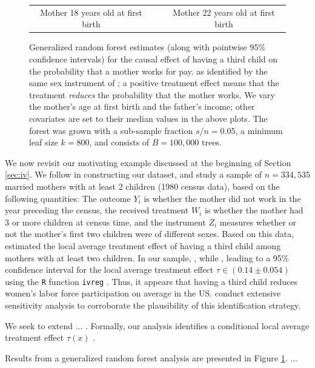 \documentclass[aos]{imsart}
\theoremstyle{plain}
\theoremstyle{definition}
\theoremstyle{remark}
\begin{document}
\begin{CJK}{UTF8}{gbsn}
\begin{figure}
\begin{tabular}{ccc}
Mother 18 years old at first birth & & Mother 22 years old at first birth
\end{tabular}
\caption{Generalized random forest estimates (along with pointwise 95\% confidence intervals)
for the causal effect of having a third child on the probability
that a mother works for pay.
as identified by the same sex instrument of \citet{angrist1998children};
a positive treatment effect means that the treatment \emph{reduces} the probability that the mother works.
We vary the mother's age at first birth
and the father's income; other covariates are set to their median values in the above plots.
The forest was grown with a sub-sample fraction $s/n = 0.05$, a minimum leaf size $k = 800$, and
consists of $B = 100,000$ trees.}
\label{fig:familysize}
\vspace{-1.5\baselineskip}
\end{figure}

We now revisit our motivating example discussed at the beginning of Section \ref{sec:iv}.
We follow \citet{angrist1998children} in constructing our dataset, and
study a sample of $n = 334,535$ married mothers with at least 2 children (1980 census data),
based on the following quantities: The outcome $Y_i$ is whether the mother did not work in the
year preceding the census, the received treatment $W_i$ is whether the mother had 3 or more
children at census time, and the instrument $Z_i$ measures whether or not
the mother's first two children were of different sexes.
Based on this data, \citet{angrist1998children} estimated the local average treatment effect
of having a third child among mothers with at least two children.
In our sample, , while
, leading to a 95\% confidence interval for the
local average treatment effect $\tau \in (0.14 \pm 0.054)$ using the \texttt{R} function
\texttt{ivreg} \citep{kleiber2008applied}. Thus, it appears that having a third child reduces
women's labor force participation on average in the US.
\citet{angrist1998children} conduct extensive sensitivity analysis to corroborate the
plausibility of this identification strategy.

We seek to extend ... . Formally, our analysis identifies a conditional local average treatment effect $\tau(x)$ \citep{abadie2003semiparametric,imbens1994identification}.

Results from a generalized random forest analysis are presented in Figure \ref{fig:familysize}. ...


\end{CJK}
\end{document}
